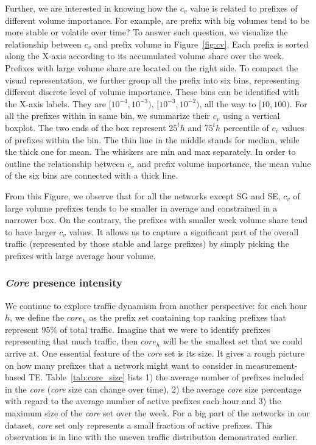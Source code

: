 Further, we are interested in knowing how the $c_v$ value is related to prefixes of different volume importance. For example, are prefix with big volumes tend to be more stable or volatile over time?
To answer such question, we visualize the relationship between $c_v$ and prefix volume in Figure~\ref{fig:cv}.
Each prefix is sorted along the X-axis according to its accumulated volume share over the week.
Prefixes with large volume share are located on the right side.
To compact the visual representation, we further group all the prefix into six bins, representing different discrete level of volume importance.
These bins can be identified with the X-axis labels.
They are $[10^{-4}, 10^{-3})$, $[10^{-3}, 10^{-2})$, all the way to $[10,100)$.
For all the prefixes within in same bin, we summarize their $c_v$ using a vertical boxplot.
The two ends of the box represent $25^th$ and $75^th$ percentile of $c_v$ values of prefixes within the bin.
The thin line in the middle stands for median, while the thick one for mean.
The whiskers are min and max separately.
In order to outline the relationship between $c_v$ and prefix volume importance, the mean value of the six bins are connected with a thick line.

From this Figure, we observe that for all the networks except SG and SE, $c_v$ of large volume prefixes tends to be smaller in average and constrained in a narrower box. 
On the contrary, the prefixes with smaller week volume share tend to have larger $c_v$ values.
It allows us to capture a significant part of the overall traffic (represented by those stable and large prefixes) by simply picking the prefixes with large average hour volume. 

\subsubsection{\textit{Core} presence intensity}
We continue to explore traffic dynamism from another perspective:
for each hour $h$, we define the $core_h$ as the prefix set containing top ranking prefixes that represent $95\%$ of total traffic. 
Imagine that we were to identify prefixes representing that much traffic, then $core_h$ will be the smallest set that we could arrive at.
One essential feature of the \textit{core} set is its size.
It gives a rough picture on how many prefixes that a network might want to consider in measurement-based TE.
Table~\ref{tab:core_size} lists 1) the average number of prefixes included in the \textit{core} (\textit{core} size can change over time), 2) the average \textit{core} size percentage with regard to the average number of active prefixes each hour and 3) the maximum size of the \textit{core} set over the week.
For a big part of the networks in our dataset, \textit{core} set only represents a small fraction of active prefixes.
This observation is in line with the uneven traffic distribution demonstrated earlier.


